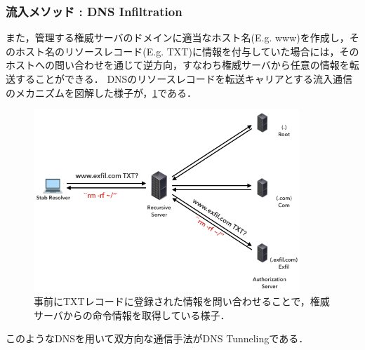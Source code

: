 \subsubsection{流入メソッド : DNS Infiltration}
また，管理する権威サーバのドメインに適当なホスト名(E.g. www)を作成し，そのホスト名のリソースレコード(E.g. TXT)に情報を付与していた場合には，そのホストへの問い合わせを通じて逆方向，すなわち権威サーバから任意の情報を転送することができる．
DNSのリソースレコードを転送キャリアとする流入通信のメカニズムを図解した様子が，\ref{fig:dns-infiltration}である．

\begin{figure}[h]
 \centering
 \includegraphics[width=10.0cm]{figure/dns-infiltration.png}
 \caption{事前にTXTレコードに登録された情報を問い合わせることで，権威サーバからの命令情報を取得している様子．}
 \label{fig:dns-infiltration}
\end{figure}

このようなDNSを用いて双方向な通信手法がDNS Tunnelingである．

